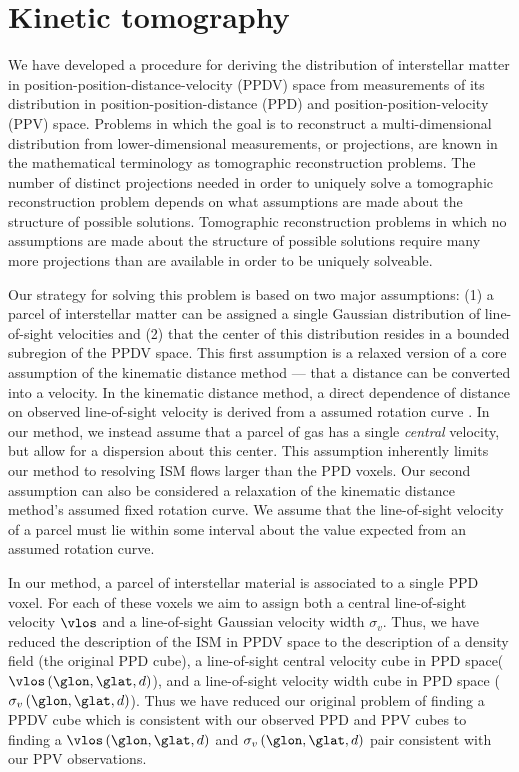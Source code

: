 \section{Kinetic tomography}
\label{sec:KT}

We have developed a procedure for deriving the distribution of interstellar matter in position-position-distance-velocity (PPDV) space from measurements of its distribution in position-position-distance (PPD) and position-position-velocity (PPV) space. 
Problems in which the goal is to reconstruct a multi-dimensional distribution from lower-dimensional measurements, or projections, are known in the mathematical terminology as tomographic reconstruction problems.
The number of distinct projections needed in order to uniquely solve a tomographic reconstruction problem depends on what assumptions are made about the structure of possible solutions. 
Tomographic reconstruction problems in which no assumptions are made about the structure of possible solutions require many more projections than are available in order to be uniquely solveable.

Our strategy for solving this problem is based on two major assumptions: (1) a parcel of interstellar matter can be assigned a single Gaussian distribution of line-of-sight velocities and (2) that the center of this distribution resides in a bounded subregion of the PPDV space. This first assumption is a relaxed version of a core assumption of the kinematic distance method --- that a distance can be converted into a velocity. In the kinematic distance method, a direct dependence of distance on observed line-of-sight velocity is derived from a assumed rotation curve \citep[e.g.][]{Levine_2006}. In our method, we instead assume that a parcel of gas has a single \emph{central} velocity, but allow for a dispersion about this center. This assumption inherently limits our method to resolving ISM flows larger than the PPD voxels. Our second assumption can also be considered a relaxation of the kinematic distance method's assumed fixed rotation curve. We assume that the line-of-sight velocity of a parcel must lie within some interval about the value expected from an assumed rotation curve. 

In our method, a parcel of interstellar material is associated to a single PPD voxel. For each of these voxels we aim to assign both a central line-of-sight velocity $\vlos$ and a line-of-sight Gaussian velocity width $\sigma_v$. Thus, we have reduced the description of the ISM in PPDV space to the description of a density field (the original PPD cube), a line-of-sight central velocity cube in PPD space($\vlos\left(\glon, \glat, d \right)$), and a line-of-sight velocity width cube in PPD space ($\sigma_v \left(\glon, \glat, d \right)$). Thus we have reduced our original problem of finding a PPDV cube which is consistent with our observed PPD and PPV cubes to finding a $\vlos\left(\glon, \glat, d \right)$ and $\sigma_v \left(\glon, \glat, d \right)$ pair consistent with our PPV observations. 

